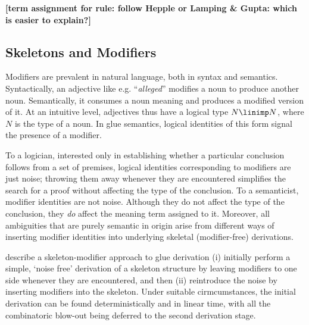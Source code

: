 {\bf [term assignment for rule: follow Hepple or Lamping \& Gupta: 
which is easier to explain?]}
 
\subsection{Skeletons and Modifiers}

Modifiers are prevalent in natural language, both in syntax and semantics.
Syntactically, an adjective like e.g. ``{\it alleged}''
modifies a noun to produce another noun.  Semantically, it consumes
a noun meaning and produces a modified version of it.  At an intuitive
level, adjectives thus have a logical type $N\linimp N$, where $N$ is the
type of a noun.  In glue semantics, logical identities of this form
signal the presence of a modifier. 

To a logician,
interested only in establishing whether a particular conclusion
follows from a set of premises, logical identities corresponding to
modifiers are just noise;
throwing them away whenever they
are encountered simplifies the search for a proof without affecting
the type of the conclusion.  To a semanticist, modifier identities are not
noise.  Although they do not affect the type of the conclusion, they
{\em do} affect the meaning term assigned to it.
Moreover, all ambiguities that are purely semantic in origin arise from
different ways of inserting modifier identities into underlying skeletal
(modifier-free) derivations.

 describe a
 skeleton-modifier approach to glue derivation 
(i) initially perform a simple, `noise free' derivation
of a skeleton structure
by leaving modifiers to one side whenever they are encountered, and
then (ii) reintroduce the noise by inserting modifiers into the
skeleton.
Under suitable cirmcumstances, the initial derivation can be found 
deterministically and in linear time, with all the combinatoric
blow-out being deferred to the second derivation stage.  

